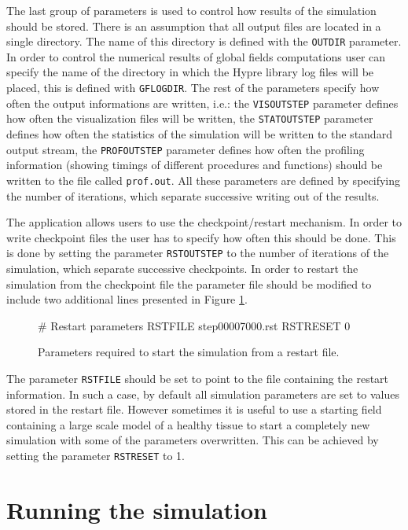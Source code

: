 \documentclass[10pt]{article}
\newenvironment{code}%
   {\snugshade\verbatim}%
   {\endverbatim\endsnugshade}
\begin{document}
\indent The last group of parameters is used to control how results of the simulation should be stored. There is an assumption that all output files are located in a single directory. The name of this directory is defined with the {\tt OUTDIR} parameter. In order to control the numerical results of global fields computations user can specify the name of the directory in which the Hypre library log files will be placed, this is defined with {\tt GFLOGDIR}. The rest of the parameters specify how often the output informations are written, i.e.: the {\tt VISOUTSTEP} parameter defines how often the visualization files will be written, the {\tt STATOUTSTEP} parameter defines how often the statistics of the simulation will be written to the standard output stream, the {\tt PROFOUTSTEP} parameter defines how often the profiling information (showing timings of different procedures and functions) should be written to the file called {\tt prof.out}. All these parameters are defined by specifying the number of iterations, which separate successive writing out of the results.

\indent The application allows users to use the checkpoint/restart mechanism. In order to write checkpoint files the user has to specify how often this should be done. This is done by setting the parameter {\tt RSTOUTSTEP} to the number of iterations of the simulation, which separate successive checkpoints. In order to restart the simulation from the checkpoint file the parameter file should be modified to include two additional lines presented in Figure \ref{parameterrestart}.

\begin{figure}
\begin{code}
# Restart parameters
RSTFILE step00007000.rst
RSTRESET 0
\end{code}
\caption{Parameters required to start the simulation from a restart file.}
\label{parameterrestart}
\end{figure}

\indent The parameter {\tt RSTFILE} should be set to point to the file containing the restart information. In such a case, by default all simulation parameters are set to values stored in the restart file. However sometimes it is useful to use a starting field containing a large scale model of a healthy tissue to start a completely new simulation with some of the parameters  overwritten. This can be achieved by setting the parameter {\tt RSTRESET} to 1.

\section{Running the simulation}
\end{document}
